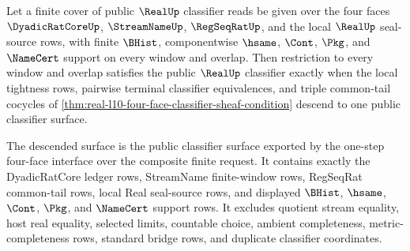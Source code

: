 \begin{theorem}
\label{thm:real-l10-finite-cover-classifier-descent}
Let a finite cover of public $\RealUp$ classifier reads be given over the four faces $\DyadicRatCoreUp$, $\StreamNameUp$, $\RegSeqRatUp$, and the local $\RealUp$ seal-source rows, with finite $\BHist$, componentwise $\hsame$, $\Cont$, $\Pkg$, and $\NameCert$ support on every window and overlap. Then restriction to every window and overlap satisfies the public $\RealUp$ classifier exactly when the local tightness rows, pairwise terminal classifier equivalences, and triple common-tail cocycles of \autoref{thm:real-l10-four-face-classifier-sheaf-condition} descend to one public classifier surface.

The descended surface is the public classifier surface exported by the one-step four-face interface over the composite finite request. It contains exactly the DyadicRatCore ledger rows, StreamName finite-window rows, RegSeqRat common-tail rows, local Real seal-source rows, and displayed $\BHist$, $\hsame$, $\Cont$, $\Pkg$, and $\NameCert$ support rows. It excludes quotient stream equality, host real equality, selected limits, countable choice, ambient completeness, metric-completeness rows, standard bridge rows, and duplicate classifier coordinates.
\end{theorem}
